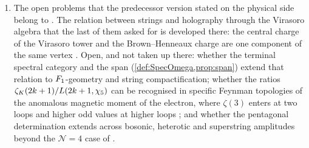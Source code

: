 \begin{enumerate}
    $\sum_{a=1}^4\chiv(a)\mathrm{Li}_s(\zeta_5^{\,a})$ is transcendental for every odd $s\ge3$, the cases $s=1$
    (Baker's theorem) and $s$ even (Lindemann's) being settled in \cref{rmk:nature-L}; whether the pentagonal structure of the
    motive of $L(s,\chiv)$ gives constraints toward Grothendieck's period conjecture \cite{grothendieck66}, for
    which $L(s,\chiv)$ is a period in the sense of Kontsevich and Zagier \cite{kontsevichzagier01}; whether
    multiple zeta values admit a pentagonal factorisation compatible with their stuffle relations; whether
    $\zeta(3)=\zeta_K(3)/L(3,\chiv)$ has an Ap\'ery-type rapidly convergent presentation through the pentagonal
    Hurwitz data; the question whether $G$ is a finite-level reflection of the motivic Galois group acting on
    the odd-degree generators is answered in the negative in \cref{rmk:G-motivic}.
  \item The open problems that the predecessor version stated on the physical side belong to
    \cite{gonzalez26cw}.  The relation between strings and holography through the Virasoro algebra that the
    last of them asked for is developed there: the central charge of the Virasoro tower and the
    Brown--Henneaux charge are one component of the same vertex \cite[\S3.5]{gonzalez26cw}.  Open, and not
    taken up there: whether the terminal spectral category and the span (\cref{def:SpecOmega,prop:span})
    extend that relation to $F_1$-geometry and string compactification; whether the ratios
    $\zeta_K(2k+1)/L(2k+1,\chi_5)$ can be recognised in specific Feynman topologies of the anomalous magnetic
    moment of the electron, where $\zeta(3)$ enters at two loops \cite{petermann58,sommerfield57} and higher odd
    values at higher loops \cite{laporta96}; and whether the pentagonal determination extends across bosonic,
    heterotic and superstring amplitudes beyond the $\mathcal N=4$ case of \cite{elvang26}.
\end{enumerate}


